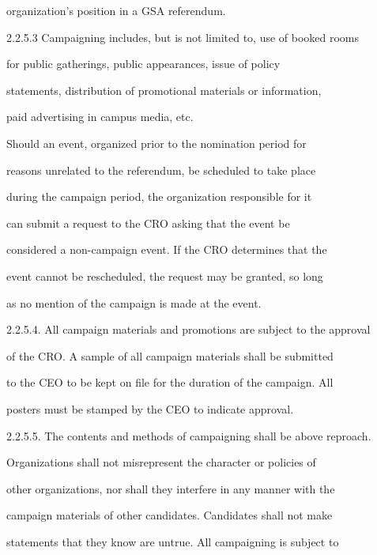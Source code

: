               organization’s position in a GSA referendum.   

  

2.2.5.3       Campaigning includes, but is not limited to, use of booked rooms  

              for    public    gatherings,      public     appearances,       issue     of   policy  

              statements,  distribution  of  promotional  materials  or  information,  

              paid advertising in campus media, etc.   

  

              Should  an  event,  organized  prior  to  the  nomination  period  for  

              reasons  unrelated  to  the  referendum,  be  scheduled  to  take  place  

              during  the  campaign  period,  the  organization  responsible  for  it  

              can  submit  a  request  to  the  CRO  asking  that  the  event  be  

              considered a non-campaign event. If the CRO determines that the  

              event cannot be rescheduled, the request may be granted, so long  

              as no mention of the campaign is made at the event.  

2.2.5.4.     All campaign materials and promotions are subject to the approval  

             of the CRO. A sample of all campaign materials shall be submitted  

             to the CEO to be kept on file for the duration of the campaign. All  

             posters must be stamped by the CEO to indicate approval.   

2.2.5.5.     The contents and methods of campaigning shall be above reproach.  

             Organizations  shall  not  misrepresent  the  character  or  policies  of  

             other organizations, nor shall they interfere in any manner with the  

             campaign materials of other candidates. Candidates shall not make  

             statements that they know are untrue. All campaigning is subject to  

